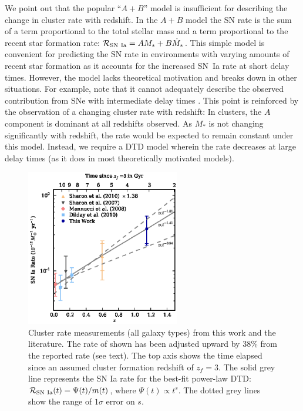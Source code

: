 We point out that the popular ``$A+B$'' model \citep{scannapieco05a}
is insufficient for describing the change in cluster rate with
redshift. In the $A+B$ model the SN rate is the sum of a term
proportional to the total stellar mass and a term proportional to the
recent star formation rate: $\mathcal{R}_{\rm SN~Ia} = AM_\ast + B
\dot{M}_\ast$. This simple model is convenient for predicting the SN
rate in environments with varying amounts of recent star formation as
it accounts for the increased SN~Ia rate at short delay
times. \citep[In fact, we use this model in][to derive limits on the
  expected ratio of SNe~Ia to SNe~CC in early-type
  galaxies.]{meyers11a} However, the model lacks theoretical
motivation and breaks down in other situations. For example,
\citet{greggio08a} note that it cannot adequately describe the
observed contribution from SNe with intermediate delay times
\citep[e.g.,][]{totani08a}.  This point is reinforced by the
observation of a changing cluster rate with redshift: In clusters, the
$A$ component is dominant at all redshifts observed. As $M_\ast$ is
not changing significantly with redshift, the rate would be expected
to remain constant under this model. Instead, we require a DTD model
wherein the rate decreases at large delay times (as it does in most
theoretically motivated models).

\begin{figure}
\includegraphics[width=0.6\textwidth]{figures/clrate/clrates_color.eps}
\caption[Cluster rate measurements from this work and the
  literature.]{Cluster rate measurements (all galaxy types) from this
  work and the literature. The rate of \citet{sharon10a} shown has
  been adjusted upward by 38\% from the reported rate (see text). The
  top axis shows the time elapsed since an assumed cluster formation
  redshift of $z_f = 3$. The solid grey line represents the SN
  Ia rate for the best-fit power-law DTD: $\mathcal{R}_{\rm SN~Ia}(t)
  = \Psi(t)/m(t)$, where $\Psi(t) \propto t^s$. The dotted grey
    lines show the range of $1\sigma$ error on $s$.
\label{fig:clrates}}
\end{figure}

